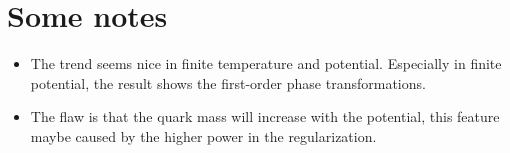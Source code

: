 \documentclass{article}
\begin{document}
\section{Some notes}
\begin{itemize}
    \item The trend seems nice in finite temperature and potential. Especially in finite potential, the result shows the first-order phase transformations.
    \item The flaw is that the quark mass will increase with the potential, this feature maybe caused by the higher power in the regularization.
\end{itemize}
\end{document}
